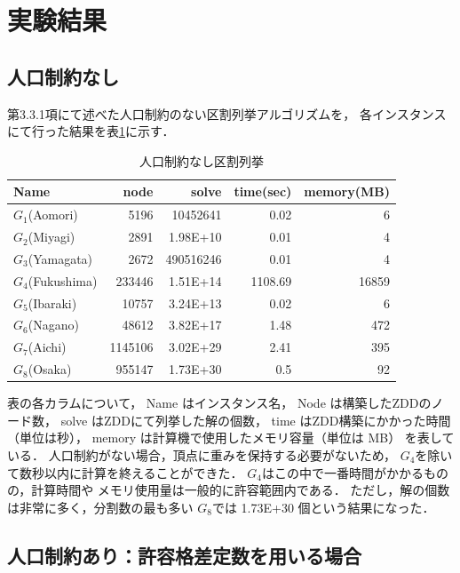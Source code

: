 \section{実験結果}

\subsection{人口制約なし}

第3.3.1項にて述べた人口制約のない区割列挙アルゴリズムを，
各インスタンスにて行った結果を表\ref{out_normal}に示す．

\begin{table}[htbp]
  \caption{人口制約なし区割列挙}
  \label{out_normal}
  \centering
  \begin{tabular}{l||r|r|r|r}
    \hline
    Name & node & solve & time(sec) & memory(MB) \\
    \hline \hline
    $G_1$(Aomori) & 5196 & 10452641 & 0.02 & 6 \\
    $G_2$(Miyagi) & 2891 & 1.98E+10 & 0.01 & 4 \\
    $G_3$(Yamagata) & 2672 & 490516246 & 0.01 & 4 \\
    $G_4$(Fukushima) & 233446 & 1.51E+14 & 1108.69 & 16859 \\
    $G_5$(Ibaraki) & 10757 & 3.24E+13 & 0.02 & 6 \\
    $G_6$(Nagano) & 48612 & 3.82E+17 & 1.48 & 472 \\
    $G_7$(Aichi) & 1145106 & 3.02E+29 & 2.41 & 395 \\
    $G_8$(Osaka) & 955147 & 1.73E+30 & 0.5 & 92 \\
    \hline
  \end{tabular}
\end{table}

表の各カラムについて，
Name はインスタンス名，
Node は構築したZDDのノード数，
solve はZDDにて列挙した解の個数，
time はZDD構築にかかった時間（単位は秒），
memory は計算機で使用したメモリ容量（単位は MB）
を表している．
人口制約がない場合，頂点に重みを保持する必要がないため，
$G_4$を除いて数秒以内に計算を終えることができた．
$G_4$はこの中で一番時間がかかるものの，計算時間や
メモリ使用量は一般的に許容範囲内である．
ただし，解の個数は非常に多く，分割数の最も多い
$G_8$では 1.73E+30 個という結果になった．

\subsection{人口制約あり：許容格差定数を用いる場合}

